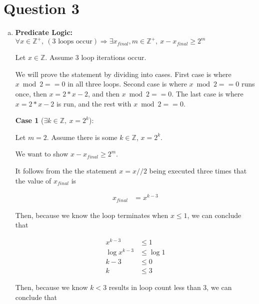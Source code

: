 \documentclass[12pt]{article}
\begin{document}
\section*{Question 3}
\begin{enumerate}[a.]
    \item

    \textbf{Predicate Logic:} $\forall x \in \mathbb{Z}^{+},\:(\text{3 loops occur})
    \Rightarrow \exists x_{final},m \in \mathbb{Z}^{+},\:x - x_{final} \geq 2^m$

    \bigskip

    Let $x \in \mathbb{Z}$. Assume 3 loop iterations occur.

    \bigskip

    We will prove the statement by dividing into cases. First case is where
    $x \bmod 2 == 0$ in all three loops. Second case is where $x \bmod 2 ==0$
    runs once, then $x = 2*x - 2$, and then $x \bmod 2 ==0$. The last case is where
    $x = 2*x - 2$ is run, and the rest with $x \bmod 2 == 0$.

    \bigskip

    \textbf{Case 1} ($\exists k \in \mathbb{Z},\:x = 2^k$):

    \bigskip

    Let $m = 2$. Assume there is some $k \in \mathbb{Z}$, $x = 2^k$.

    \bigskip

    We want to show $x - x_{final} \geq 2^m$.

    \bigskip

    It follows from the the statement $x = x // 2$ being executed three
    times that the value of $x_{final}$ is

    \setcounter{equation}{0}
    \begin{align}
        x_{final} &= x^{k-3}
    \end{align}

    \bigskip

    Then, because we know the loop terminates when $x \leq 1$, we can conclude that

    \begin{align}
        x^{k-3} &\leq 1\\
        \log x^{k-3} &\leq \log 1\\
        k-3 &\leq 0\\
        k &\leq 3
    \end{align}

    \bigskip

    Then, because we know $k < 3$ results in loop count less than 3, we can conclude
    that


\end{enumerate}
\end{document}

